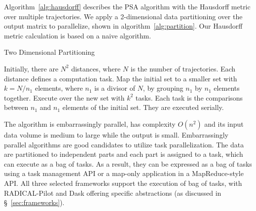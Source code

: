Algorithm~\ref{alg:hausdorff} describes the PSA algorithm with the Hausdorff metric over multiple trajectories.
We apply a 2-dimensional data partitioning over the output matrix to parallelize, shown in algorithm~\ref{alg:partition}.
Our Hausdorff metric calculation is based on a naive algorithm.

\begin{algorithm}[t]
    \scriptsize
    \caption{Two Dimensional Partitioning}
    \label{alg:partition}
    \begin{algorithmic}[1]
        \State Initially, there are $N^2$ distances, where $N$ is the number of trajectories.
        Each distance defines a computation task.
        \State Map the initial set to a smaller set with $k=N/n_1$ elements, where $n_1$ is a divisor of $N$, by grouping $n_1$ by $n_1$ elements together.
        \State Execute over the new set with $k^2$ tasks.
        Each task is the comparisons between $n_1$ and $n_1$  elements of the initial set.
        They are executed serially.
    \end{algorithmic}
\end{algorithm}

The algorithm is embarrassingly parallel, has complexity $O(n^2)$ and its input data volume is medium to large while the output is small.
Embarrassingly parallel algorithms are good candidates to utilize task parallelization.
The data are partitioned to independent parts and each part is assigned to a task, which can execute as a bag of tasks.
As a result, they can be expressed as a bag of tasks using a task management API or a map-only application in a MapReduce-style API.
All three selected frameworks support the execution of bag of tasks, with RADICAL-Pilot and Dask offering specific abstractions (as discussed in \S~\ref{sec:frameworks}).

